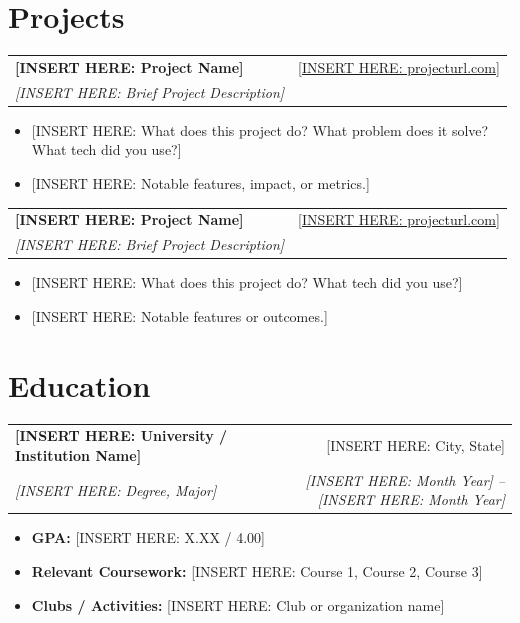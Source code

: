 \documentclass[letterpaper,10pt]{article}
\makeatletter
\newcommand{\resumeHeading}[4]{
    \begin{tabular*}{0.99\textwidth}[t]{l@{\extracolsep{\fill}}r}
      \textbf{#1} & #2 \\
      \textit{\small#3} & \textit{\small #4} \\
    \end{tabular*}\vspace{-5pt}
}
\newcommand{\resumeItemListStart}{\begin{itemize}}
\newcommand{\resumeItemListEnd}{\end{itemize}\vspace{-5pt}}
\makeatother
\begin{document}
\vspace{4pt}
\section{Projects}

  \resumeHeading
    {[INSERT HERE: Project Name]}{\small\href{https://[INSERT HERE: projecturl.com]}{[INSERT HERE: projecturl.com]}}
    {[INSERT HERE: Brief Project Description]}{}
  \resumeItemListStart
    \vspace{2pt}
    \item\small{[INSERT HERE: What does this project do? What problem does it solve? What tech did you use?]}
    \vspace{-4pt}
    \item\small{[INSERT HERE: Notable features, impact, or metrics.]}
    \vspace{-4pt}
  \resumeItemListEnd

  \vspace{4pt}

  \resumeHeading
    {[INSERT HERE: Project Name]}{\small\href{https://[INSERT HERE: projecturl.com]}{[INSERT HERE: projecturl.com]}}
    {[INSERT HERE: Brief Project Description]}{}
  \resumeItemListStart
    \vspace{2pt}
    \item\small{[INSERT HERE: What does this project do? What tech did you use?]}
    \vspace{-4pt}
    \item\small{[INSERT HERE: Notable features or outcomes.]}
    \vspace{-4pt}
  \resumeItemListEnd

\vspace{-5pt}
\section{Education}

  \resumeHeading
    {[INSERT HERE: University / Institution Name]}{[INSERT HERE: City, State]}
    {[INSERT HERE: Degree, Major]}{[INSERT HERE: Month Year] -- [INSERT HERE: Month Year]}
  \resumeItemListStart
    \vspace{2pt}
    \item\small{\textbf{GPA:} [INSERT HERE: X.XX / 4.00]}
    \vspace{-4pt}
    \item\small{\textbf{Relevant Coursework:} [INSERT HERE: Course 1, Course 2, Course 3]}
    \vspace{-4pt}
    \item\small{\textbf{Clubs / Activities:} [INSERT HERE: Club or organization name]}
    \vspace{-4pt}
  \resumeItemListEnd
\end{document}
